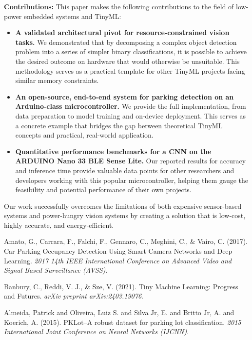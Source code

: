 \documentclass[sigconf,10pt,nonacm]{acmart}
\begin{document}
\noindent\textbf{Contributions:}
This paper makes the following contributions to the field of low-power embedded systems and TinyML:
\begin{itemize}
    \item \textbf{A validated architectural pivot for resource-constrained vision tasks.} We demonstrated that by decomposing a complex object detection problem into a series of simpler binary classifications, it is possible to achieve the desired outcome on hardware that would otherwise be unsuitable. This methodology serves as a practical template for other TinyML projects facing similar memory constraints.
    
    \item \textbf{An open-source, end-to-end system for parking detection on an Arduino-class microcontroller.} We provide the full implementation, from data preparation to model training and on-device deployment. This serves as a concrete example that bridges the gap between theoretical TinyML concepts and practical, real-world application.
    
    \item \textbf{Quantitative performance benchmarks for a CNN on the ARDUINO Nano 33 BLE Sense Lite.} Our reported results for accuracy and inference time provide valuable data points for other researchers and developers working with this popular microcontroller, helping them gauge the feasibility and potential performance of their own projects.
\end{itemize}

Our work successfully overcomes the limitations of both expensive sensor-based systems and power-hungry vision systems by creating a solution that is low-cost, highly accurate, and energy-efficient.

\begin{thebibliography}{9}

Amato, G., Carrara, F., Falchi, F., Gennaro, C., Meghini, C., \& Vairo, C. (2017).
Car Parking Occupancy Detection Using Smart Camera Networks and Deep Learning.
\textit{2017 14th IEEE International Conference on Advanced Video and Signal Based Surveillance (AVSS)}.

Banbury, C., Reddi, V. J., \& Sze, V. (2021).
Tiny Machine Learning: Progress and Futures.
\textit{arXiv preprint arXiv:2403.19076}.

Almeida, Patrick and Oliveira, Luiz S. and Silva Jr, E. and Britto Jr, A. and Koerich, A. (2015).
PKLot--A robust dataset for parking lot classification.
\textit{2015 International Joint Conference on Neural Networks (IJCNN)}.

\end{thebibliography}
\end{document}
